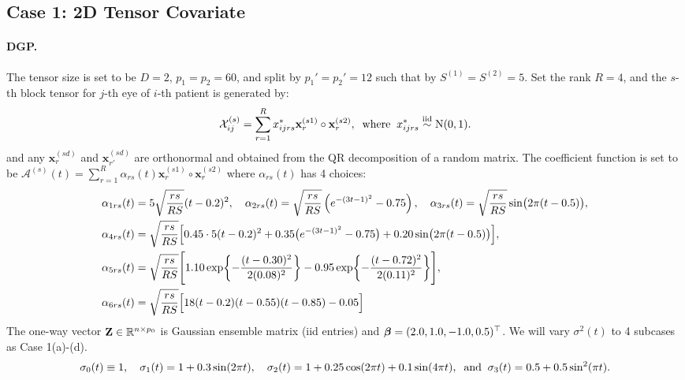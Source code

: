 \documentclass[10pt]{notes}
\begin{document}
\subsection*{Case 1: 2D Tensor Covariate}
\paragraph*{DGP.}
The tensor size is set to be $D=2$, $p_1=p_2=60$, and split by $p_1'=p_2'=12$ such that by $S^{(1)}=S^{(2)}=5$. Set the rank $R=4$, and the $s$-th block tensor for $j$-th eye of $i$-th patient is generated by:
\begin{align*}
    \mathcal{X}_{ij}^{(s)}=\sum_{r=1}^{R}x^*_{ijrs}\mathbf{x}_{r}^{(s1)}\circ\mathbf{x}_{r}^{(s2)},
    \;\;\text{where}\;\;
    x_{ijrs}^*\mathrel{\overset{\mathrm{iid}}{\sim}} \mathrm{N}(0,1).
\end{align*}
and any $\mathbf{x}_{r}^{(sd)}$ and $\mathbf{x}_{r'}^{(sd)}$ are orthonormal and obtained from the QR decomposition of a random matrix. The coefficient function is set to be $\mathcal{A}^{(s)}(t)=\sum_{r=1}^{R} \alpha_{rs}(t)\mathbf{x}_r^{(s1)}\circ \mathbf{x}_r^{(s2)}$ where $\alpha_{rs}(t)$ has 4 choices:
\begin{align*}
    &\alpha_{1rs}(t)=
    5\sqrt{\frac{rs}{RS}}(t-0.2)^2,\quad
    \alpha_{2rs}(t)=
    \sqrt{\frac{rs}{RS}}
    \left(e^{-(3t-1)^2}-0.75\right),\quad
    \alpha_{3rs}(t)=
    \sqrt{\frac{rs}{RS}}\sin\bigl(2\pi(t-0.5)\bigr),\\
    &\alpha_{4rs}(t)=
    \sqrt{\frac{rs}{RS}}
    \Bigl[
    0.45\cdot 5(t-0.2)^2
    +0.35\bigl(e^{-(3t-1)^2}-0.75\bigr)
    +0.20\sin\bigl(2\pi(t-0.5)\bigr)
    \Bigr],\\
    &\alpha_{5rs}(t)=
    \sqrt{\frac{rs}{RS}}
    \Biggl[
    1.10\exp\!\left\{-\frac{(t-0.30)^2}{2(0.08)^2}\right\}
    -0.95\exp\!\left\{-\frac{(t-0.72)^2}{2(0.11)^2}\right\}
    \Biggr],\\
    &\alpha_{6rs}(t)=
    \sqrt{\frac{rs}{RS}}
    \Bigl[
    18(t-0.2)(t-0.55)(t-0.85)-0.05
    \Bigr]
\end{align*}
The one-way vector $\mathbf{Z}\in\mathbb{R}^{n\times p_0}$ is Gaussian ensemble matrix (iid entries) and $\bm{\beta}=(2.0,1.0,-1.0,0.5)^\top$. We will vary $\sigma^2(t)$ to 4 subcases as Case 1(a)-(d).
\begin{align}
    \sigma_0(t)\equiv 1,\quad
    \sigma_1(t)=1+0.3\sin(2\pi t),\quad
    \sigma_2(t)=1+0.25\cos(2\pi t)+0.1 \sin(4\pi t),\;\;\text{and}\;\;
    \sigma_3(t)=0.5+0.5\sin^2(\pi t).
\end{align}
\end{document}
